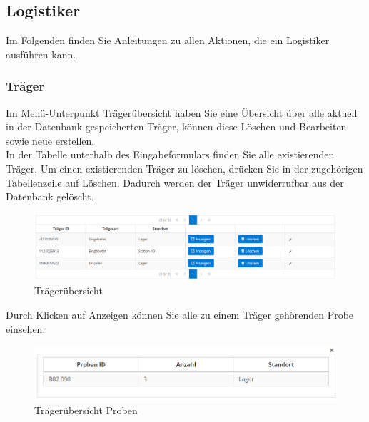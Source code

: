 \documentclass[enabledeprecatedfontcommands,fontsize=12pt,paper=a4,twoside]{scrartcl}
\begin{document}
\subsection{Logistiker}

Im Folgenden finden Sie Anleitungen zu allen Aktionen, die ein Logistiker ausführen kann. \\

\subsubsection{Träger}
Im Menü-Unterpunkt Trägerübersicht haben Sie eine Übersicht über alle aktuell in der Datenbank gespeicherten Träger, können diese Löschen und Bearbeiten sowie neue erstellen. \\

In der Tabelle unterhalb des Eingabeformulars finden Sie alle existierenden Träger. Um einen existierenden Träger zu löschen, drücken Sie in der zugehörigen Tabellenzeile auf Löschen. Dadurch werden der Träger unwiderrufbar aus der Datenbank gelöscht. \\

\begin{figure}[h!]
\begin{center}
 \includegraphics[width=\textwidth]{screenshots/l/trager.png}
  \caption{Trägerübersicht}
  \label{fig:boat1}
\end{center}
\end{figure}

Durch Klicken auf Anzeigen können Sie alle zu einem Träger gehörenden Probe einsehen. \\

\begin{figure}[h!]
\begin{center}
 \includegraphics[width=\textwidth]{screenshots/l/tragerproben.png}
  \caption{Trägerübersicht Proben}
  \label{fig:boat1}
\end{center}
\end{figure}
\end{document}
